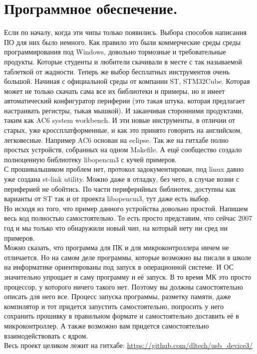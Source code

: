 \documentclass[12pt,a4paper]{article}
\begin{document}
\newpage
\section{Программное обеспечение.}
    Если по началу, когда эти чипы только появились. Выбора способов написания
    ПО для них было немного. Как правило это были коммерческие среды
    среды программирования под Windows, довольно тормозные и
    требовательные продукты. Которые студенты и любители скачивали
    в месте с так называемой таблеткой от жадности. Теперь же выбор
    бесплатных инструментов очень большой. Начиная с официальной среды от
    компании ST, STM32Cube. Которая может не только скачать сама все их
    библиотеки и примеры, но и имеет автоматический конфигуратор периферии (это
    такая штука, которая предлагает настраивать регистры, тыкая мышкой).
    И заканчивая сторонними продуктами, таким как AC6 system workbench.
    И эти новые инструменты, в отличии от старых, уже кроссплатформенные, и
    как это принято говорить на английском, легковесные. Например AC6
    основан на eclipse.
    Так же на гитхабе полно простых устройств, собранных на одном Makefile.
    А ещё сообщество создало полноценную библиотеку libopencm3 с кучей
    примеров.\\
    С прошивальшиком проблем нет, протокол задокументирован, под linux давно уже
    создана st-link utility. Можно даже в отладку, без чего, в случае возни с
    периферией не обойтись. По части периферийных библиотек, доступны как
    варианты от ST так и от проекта libopencm3, тут даже есть выбор.\\
    Но исходя из того, что пример данного устройства довольно простой. Напишем
    весь код полностью самостоятельно. То есть просто представим, что сейчас
    2007 год и мы только что обнаружили новый чип, на который нету ни сред ни
    примеров.\\
    Можно сказать, что программа для ПК и для микроконтроллера ничем не
    отличается. Но на самом деле программы, которые возможно вы писали в школе
    на информатике ориентированы под запуск в операционной системе. И ОС
    значительно упрощает и саму программу и её запуск. В то время
    МК это просто процессор, у которого ничего такого нет. Поэтому вы должны
    самостоятельно описать для него все. Процесс запуска программы, разметку
    памяти, даже компилятор и тот придется запустить самостоятельно, попросить
    у него сохранить прошивку в правильном формате и самостоятельно доставить
    её в микроконтроллер. А также возможно вам придется самостоятельно
    взаимодействовать с ядром.\\
    Весь проект целиком лежит на гитхабе:
    \url{https://github.com/dltech/usb_device3/}
\end{document}
